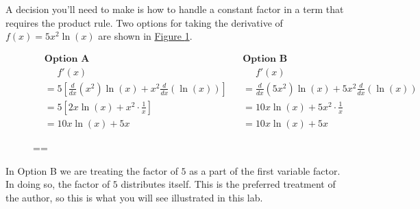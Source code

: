 \documentclass[10pt,oneside,]{book}
\theoremstyle{plain}
\theoremstyle{definition}
\numberwithin{equation}{section}
\newcommand{\fe}[2]{#1\mathopen{}\left(#2\right)\mathclose{}}
\newcommand{\fd}[1]{#1'}
\newcommand{\lzoo}[2]{{\frac{d}{d#1}}{\left(#2\right)}}
\begin{document}
\par
A decision you'll need to make is how to handle a constant factor in a term that requires the product rule.  Two options for taking the derivative of \(\fe{f}{x}=5x^2\fe{\ln}{x}\) are shown in \hyperref[figure-constant-factors-with-product-rule]{Figure \ref{figure-constant-factors-with-product-rule}}.%
\begin{figure}
\centering
\begin{align*}
&\textbf{Option A}&&\textbf{Option B}\\
&\phantom{{}={}}\fe{\fd{f}}{x}&&\phantom{{}={}}\fe{\fd{f}}{x}\\
&=5\left[\lzoo{x}{x^2}\fe{\ln}{x}+x^2\lzoo{x}{\fe{\ln}{x}}\right]&&=\lzoo{x}{5x^2}\fe{\ln}{x}+5x^2\lzoo{x}{\fe{\ln}{x}}\\
&=5\left[2x\fe{\ln}{x}+x^2\cdot\frac{1}{x}\right]&&=10x\fe{\ln}{x}+5x^2\cdot\frac{1}{x}\\
&=10x\fe{\ln}{x}+5x&&=10x\fe{\ln}{x}+5x
\end{align*}%
\caption{\binoppenalty=\maxdimen \relpenalty=\maxdimen \label{figure-constant-factors-with-product-rule}}
\end{figure}
\par
In Option B we are treating the factor of \(5\) as a part of the first variable factor.  In doing so, the factor of \(5\) distributes itself.  This is the preferred treatment of the author, so this is what you will see illustrated in this lab.%
\typeout{************************************************}
\typeout{************************************************}
\end{document}
